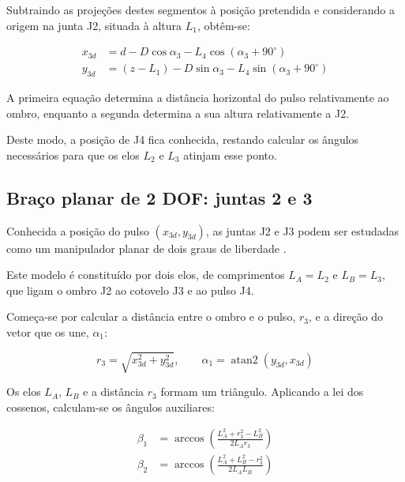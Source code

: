 Subtraindo as projeções destes segmentos à posição pretendida e considerando a origem na junta J2, situada à altura $L_1$, obtêm-se:

\begin{align}
    x_{3d} &= d-D\cos\alpha_3
    -L_4\cos(\alpha_3+90^\circ)
    \label{eq:ik_x3d}\\
    y_{3d} &= (z-L_1)-D\sin\alpha_3
    -L_4\sin(\alpha_3+90^\circ)
    \label{eq:ik_y3d}
\end{align}

A primeira equação determina a distância horizontal do pulso relativamente ao ombro, enquanto a segunda determina a sua altura relativamente a J2.

Deste modo, a posição de J4 fica conhecida, restando calcular os ângulos necessários para que os elos $L_2$ e $L_3$ atinjam esse ponto.

\subsection{Braço planar de 2 DOF: juntas 2 e 3}

Conhecida a posição do pulso $(x_{3d},y_{3d})$, as juntas J2 e J3 podem ser estudadas como um manipulador planar de dois graus de liberdade \cite{bicho_2dof}.

Este modelo é constituído por dois elos, de comprimentos $L_A=L_2$ e $L_B=L_3$, que ligam o ombro J2 ao cotovelo J3 e ao pulso J4.

Começa-se por calcular a distância entre o ombro e o pulso, $r_3$, e a direção do vetor que os une, $\alpha_1$:

\begin{equation}
    r_3=\sqrt{x_{3d}^2+y_{3d}^2},
    \qquad
    \alpha_1=\operatorname{atan2}(y_{3d},x_{3d})
    \label{eq:ik_r3}
\end{equation}

Os elos $L_A$, $L_B$ e a distância $r_3$ formam um triângulo. Aplicando a lei dos cossenos, calculam-se os ângulos auxiliares:

\begin{equation}
    \begin{aligned}
        \beta_1 &=
        \arccos\left(
        \frac{L_A^2+r_3^2-L_B^2}
        {2L_A r_3}
        \right)\\[6pt]
        \beta_2 &=
        \arccos\left(
        \frac{L_A^2+L_B^2-r_3^2}
        {2L_A L_B}
        \right)
    \end{aligned}
    \label{eq:ik_beta}
\end{equation}

